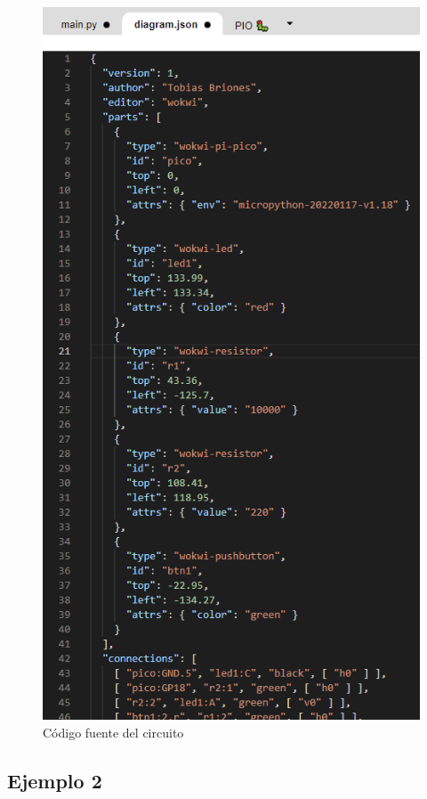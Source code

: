 \documentclass{article}
\begin{document}
    \begin{figure}[H]
        \centering
        \includegraphics[width=0.3\paperwidth]{images/wokwi-example-1-diagram-src-code}
        \caption{Código fuente del circuito}
    \end{figure}

    \subsection{Ejemplo 2}
\end{document}
